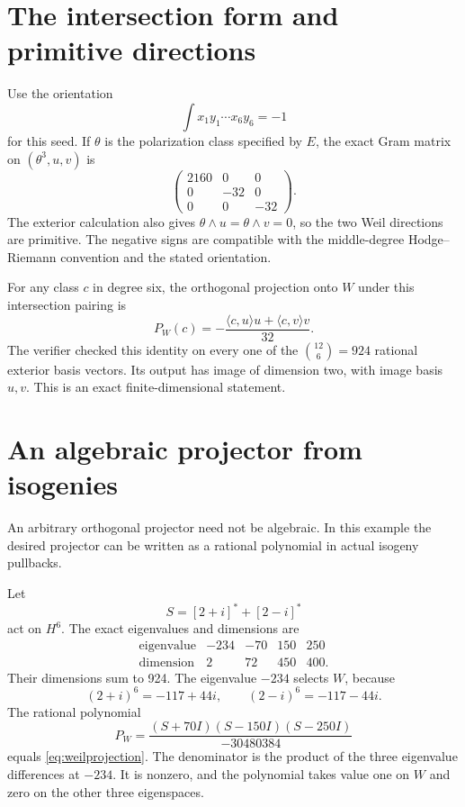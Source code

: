 \section{The intersection form and primitive directions}
Use the orientation
\[
\int x_1y_1\cdots x_6y_6=-1
\]
for this seed. If $\theta$ is the polarization class specified by $E$, the exact Gram matrix on $(\theta^3,u,v)$ is
\[
\begin{pmatrix}
2160&0&0\\
0&-32&0\\
0&0&-32
\end{pmatrix}.
\]
The exterior calculation also gives $\theta\wedge u=\theta\wedge v=0$, so the two Weil directions are primitive. The negative signs are compatible with the middle-degree Hodge--Riemann convention and the stated orientation.

For any class $c$ in degree six, the orthogonal projection onto $W$ under this intersection pairing is
\begin{equation}\label{eq:weilprojection}
P_W(c)=-\frac{\langle c,u\rangle u+\langle c,v\rangle v}{32}.
\end{equation}
The verifier checked this identity on every one of the $\binom{12}{6}=924$ rational exterior basis vectors. Its output has image of dimension two, with image basis $u,v$. This is an exact finite-dimensional statement.

\section{An algebraic projector from isogenies}
An arbitrary orthogonal projector need not be algebraic. In this example the desired projector can be written as a rational polynomial in actual isogeny pullbacks.

Let
\[
S=[2+i]^*+[2-i]^*
\]
act on $H^6$. The exact eigenvalues and dimensions are
\[
\begin{array}{c|rrrr}
\text{eigenvalue}&-234&-70&150&250\\
\text{dimension}&2&72&450&400 .
\end{array}
\]
Their dimensions sum to 924. The eigenvalue $-234$ selects $W$, because
\[
(2+i)^6=-117+44i,\qquad
(2-i)^6=-117-44i.
\]
The rational polynomial
\begin{equation}\label{eq:weilisogeny}
P_W=\frac{(S+70I)(S-150I)(S-250I)}{-30480384}
\end{equation}
equals \eqref{eq:weilprojection}. The denominator is the product of the three eigenvalue differences at $-234$. It is nonzero, and the polynomial takes value one on $W$ and zero on the other three eigenspaces.

